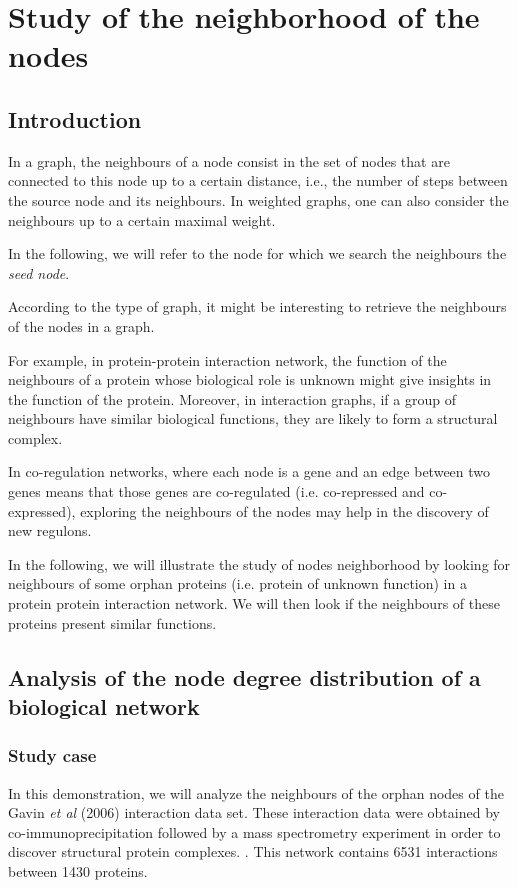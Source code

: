 \chapter{Study of the neighborhood of the nodes}

\section{Introduction}
In a graph, the neighbours of a node consist in the set of nodes that are connected
to this node up to a certain distance, i.e., the number of steps
between the source node and its neighbours. In weighted graphs, one can also consider the neighbours up to 
a certain maximal weight.

In the following, we will refer to the node for which we search the neighbours the \textit{seed node}.

According to the type of graph, it might be 
interesting to retrieve the neighbours of the nodes in a graph.

For example, in protein-protein interaction network, the function of the neighbours of a protein whose
biological role is unknown might give insights in the function of the protein.
Moreover, in interaction graphs, if a group of neighbours have similar biological functions, they are likely to
form a structural complex.

In co-regulation networks, where each node is a gene and an edge between two genes means that those genes are
co-regulated (i.e. co-repressed and co-expressed), exploring the neighbours of the nodes may help in the discovery of 
new regulons.

In the following, we will illustrate the study of nodes neighborhood by looking for neighbours of some orphan proteins (i.e. protein of unknown function)  in a protein protein interaction network. We will then look if the neighbours of these proteins present similar functions.

\section{Analysis of the node degree distribution of a biological network}
\subsection{Study case}

In this demonstration, we will analyze the neighbours of the orphan nodes of the 
Gavin \textit{et al} (2006) interaction data set. These interaction data were obtained
by co-immunoprecipitation followed by a mass spectrometry experiment in order to
discover structural protein complexes. \cite{Gavin2006}. 
This network contains 6531 interactions between 1430
proteins.

